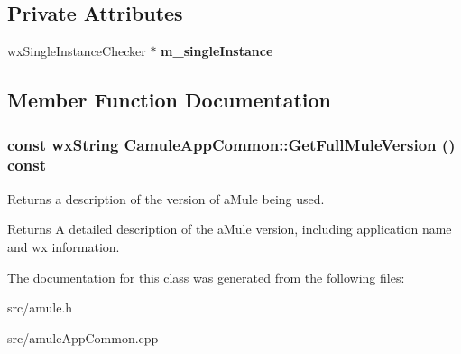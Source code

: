 \subsection*{Private Attributes}
\begin{DoxyCompactItemize}
\item 
wxSingleInstanceChecker $\ast$ {\bfseries m\_\-singleInstance}\label{classCamuleAppCommon_ad78cacacd460b14f84f0b78022f18fcd}

\end{DoxyCompactItemize}


\subsection{Member Function Documentation}
\subsubsection[{GetFullMuleVersion}]{\setlength{\rightskip}{0pt plus 5cm}const wxString CamuleAppCommon::GetFullMuleVersion () const}\label{classCamuleAppCommon_a78102dc8848e767bc6ddeb1ff2c752e6}


Returns a description of the version of aMule being used. \begin{DoxyReturn}{Returns}
A detailed description of the aMule version, including application name and wx information. 
\end{DoxyReturn}


The documentation for this class was generated from the following files:\begin{DoxyCompactItemize}
\item 
src/amule.h\item 
src/amuleAppCommon.cpp\end{DoxyCompactItemize}
